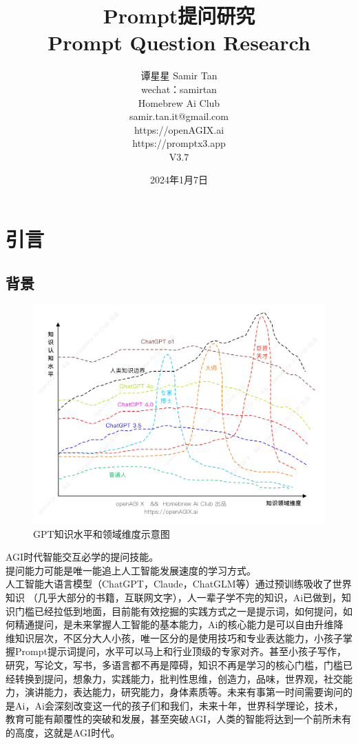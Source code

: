 \documentclass[12pt]{book}
\title{Prompt提问研究\\
Prompt Question Research}
\author{谭星星 Samir Tan\\
	wechat：samirtan\\
	Homebrew Ai Club\\
	samir.tan.it@gmail.com\\
	https://openAGIX.ai\\
	https://promptx3.app\\
V3.7
}
\date{2024年1月7日} %
\begin{document}
	
	\frontmatter
	\maketitle
	\tableofcontents
	\mainmatter
	
	\chapter{引言}
	\section{背景}
		\begin{figure}[htbp]
		\centering
		\includegraphics[width=1.0\textwidth]{image/gpt.png}
		\caption{GPT知识水平和领域维度示意图}
		\label{fig:myImage1}
	\end{figure}
	
	AGI时代智能交互必学的提问技能。\\
	提问能力可能是唯一能追上人工智能发展速度的学习方式。\\
	人工智能大语言模型（ChatGPT，Claude，ChatGLM等）通过预训练吸收了世界知识 （几乎大部分的书籍，互联网文字），人一辈子学不完的知识，Ai已做到，知识门槛已经拉低到地面，目前能有效挖掘的实践方式之一是提示词，如何提问，如何精通提问，是未来掌握人工智能的基本能力，Ai的核心能力是可以自由升维降维知识层次，不区分大人小孩，唯一区分的是使用技巧和专业表达能力，小孩子掌握Prompt提示词提问，水平可以马上和行业顶级的专家对齐。甚至小孩子写作，研究，写论文，写书，多语言都不再是障碍，知识不再是学习的核心门槛，门槛已经转换到提问，想象力，实践能力，批判性思维，创造力，品味，世界观，社交能力，演讲能力，表达能力，研究能力，身体素质等。未来有事第一时间需要询问的是Ai，Ai会深刻改变这一代的孩子们和我们，未来十年，世界科学理论，技术，教育可能有颠覆性的突破和发展，甚至突破AGI，人类的智能将达到一个前所未有的高度，这就是AGI时代。
	
\end{document}
